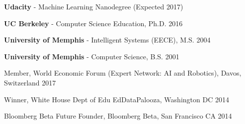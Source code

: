 \documentclass[11pt,article,oneside]{memoir}
\begin{document}
\bigskip 


\ind \textbf{Udacity} - Machine Learning Nanodegree  \hfill (Expected 2017)

\ind \textbf{UC Berkeley} - Computer Science Education, Ph.D. \hfill 2016

\ind \textbf{University of Memphis} - Intelligent Systems (EECE), M.S. \hfill 2004

\ind \textbf{University of Memphis} - Computer Science, B.S. \hfill 2001

\bigskip 

\medskip

\ind Member, World Economic Forum (Expert Network: AI and Robotics), Davos, Switzerland \hfill 2017

\ind Winner, White House Dept of Edu EdDataPalooza, Washington DC \hfill 2014

\ind Bloomberg Beta Future Founder, Bloomberg Beta, San Francisco CA \hfill 2014
\end{document}
